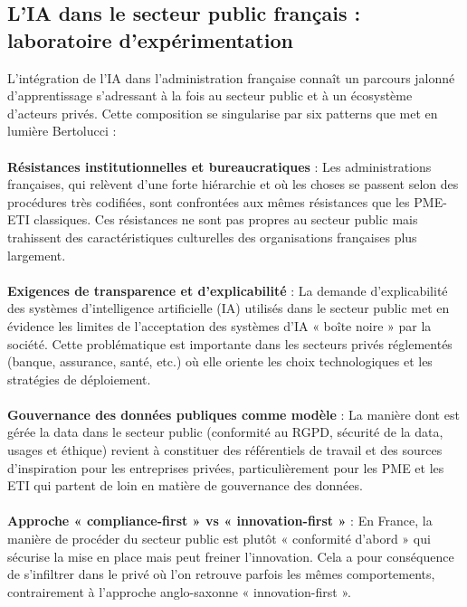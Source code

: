 \subsection{L'IA dans le secteur public français : laboratoire d'expérimentation}

L’intégration de l’IA dans l’administration française connaît un parcours jalonné d’apprentissage s’adressant à la fois au secteur public et à un écosystème d’acteurs privés. Cette composition se singularise par six patterns que met en lumière Bertolucci \cite{bertolucci2024artificial} :
\\\\
\textbf{Résistances institutionnelles et bureaucratiques} : Les administrations françaises, qui relèvent d’une forte hiérarchie et où les choses se passent selon des procédures très codifiées, sont confrontées aux mêmes résistances que les PME-ETI classiques. Ces résistances ne sont pas propres au secteur public mais trahissent des caractéristiques culturelles des organisations françaises plus largement.
\\\\
\textbf{Exigences de transparence et d'explicabilité} : La demande d'explicabilité des systèmes d'intelligence artificielle (IA) utilisés dans le secteur public met en évidence les limites de l'acceptation des systèmes d'IA « boîte noire » par la société. Cette problématique est importante dans les secteurs privés réglementés (banque, assurance, santé, etc.) où elle oriente les choix technologiques et les stratégies de déploiement.
\\\\
\textbf{Gouvernance des données publiques comme modèle} : La manière dont est gérée la data dans le secteur public (conformité au RGPD, sécurité de la data, usages et éthique) revient à constituer des référentiels de travail et des sources d'inspiration pour les entreprises privées, particulièrement pour les PME et les ETI qui partent de loin en matière de gouvernance des données.
\\\\
\textbf{Approche « compliance-first » vs « innovation-first »} : En France, la manière de procéder du secteur public est plutôt « conformité d'abord » qui sécurise la mise en place mais peut freiner l'innovation. Cela a pour conséquence de s'infiltrer dans le privé où l'on retrouve parfois les mêmes comportements, contrairement à l'approche anglo-saxonne « innovation-first ».

